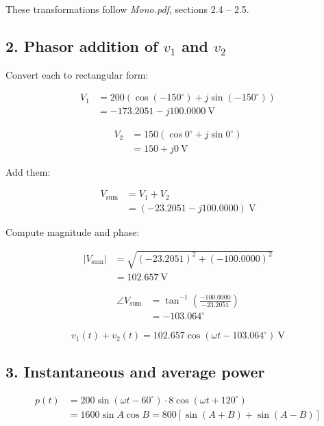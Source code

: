 \documentclass{article}
\begin{document}
These transformations follow \emph{Mono.pdf}, sections 2.4 – 2.5.

\subsection*{2. Phasor addition of \(v_1\) and \(v_2\)}

Convert each to rectangular form:

\[
\begin{aligned}
V_1 &= 200(\cos(-150^\circ)+j\sin(-150^\circ))\\
    &= -173.2051 - j100.0000\ \text{V}
\end{aligned}
\]

\[
\begin{aligned}
V_2 &= 150(\cos 0^\circ + j\sin 0^\circ)\\
    &= 150 + j0\ \text{V}
\end{aligned}
\]

Add them:

\[
\begin{aligned}
V_{\text{sum}} &= V_1 + V_2\\
               &= (-23.2051 - j100.0000)\ \text{V}
\end{aligned}
\]

Compute magnitude and phase:

\[
\begin{aligned}
|V_{\text{sum}}|
 &= \sqrt{(-23.2051)^2 + (-100.0000)^2}\\
 &= 102.657\ \text{V}
\end{aligned}
\]

\[
\begin{aligned}
\angle V_{\text{sum}}
 &= \tan^{-1}\!\left(\frac{-100.0000}{-23.2051}\right)\\
 &= -103.064^\circ
\end{aligned}
\]

\[
\boxed{v_1(t)+v_2(t)=102.657\cos(\omega t-103.064^\circ)\ \text{V}}
\]

\subsection*{3. Instantaneous and average power}

\[
\begin{aligned}
p(t)
 &= 200\sin(\omega t-60^\circ)\cdot8\cos(\omega t+120^\circ)\\
 &= 1600\sin A\cos B
  = 800[\sin(A+B)+\sin(A-B)]
\end{aligned}
\]
\end{document}
